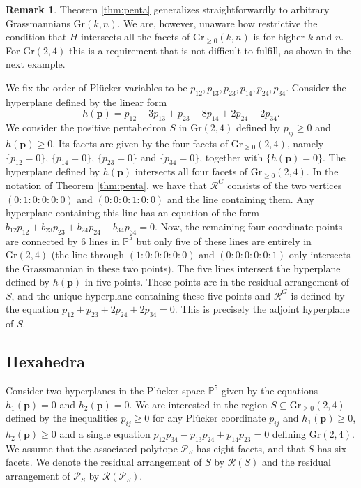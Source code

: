 \documentclass[12pt]{extarticle}
\theoremstyle{definition}
\newtheorem{remark}[theorem]{Remark}
\newenvironment{example}
{\pushQED{\qed}\renewcommand{\qedsymbol}{$\diamond$}\examplex}
{\popQED\endexamplex}
\begin{document}
\begin{remark}
    Theorem \ref{thm:penta} generalizes straightforwardly to arbitrary Grassmannians $\mathrm{Gr}(k,n)$. We are, however, unaware how restrictive the condition that $H$ intersects all the facets of $\mathrm{Gr}_{\geq 0}(k,n)$ is for higher $k$ and $n$. For $\mathrm{Gr}(2,4)$ this is a requirement that is not difficult to fulfill, as shown in the next example. 
\end{remark}

\begin{example}
    We fix the order of Pl\"ucker variables to be $p_{12},p_{13},p_{23},p_{14},p_{24},p_{34}$. Consider the hyperplane defined by the linear form
    $$h(\mathbf{p}) = p_{12} - 3p_{13} + p_{23} - 8p_{14} + 2p_{24} + 2p_{34}.$$
We consider the positive pentahedron $S$ in $\mathrm{Gr}(2,4)$ defined by $p_{ij}\geq 0$ and $h(\mathbf{p})\geq 0$. Its facets are given by the four facets of $\mathrm{Gr}_{\geq 0}(2,4)$, namely $\{p_{12} = 0\}$, $\{p_{14} = 0\}$, $\{p_{23} = 0\}$ and $\{p_{34} = 0\}$, together with $\{h(\mathbf{p}) = 0\}$. The hyperplane defined by $h(\mathbf{p})$ intersects all four facets of $\mathrm{Gr}_{\geq 0}(2,4)$. In the notation of Theorem \ref{thm:penta}, we have that $\mathcal{R}^G$ consists of the two vertices $(0:1:0:0:0:0)$ and $(0:0:0:1:0:0)$ and the line containing them. Any hyperplane containing this line has an equation of the form $b_{12}p_{12}+b_{23}p_{23}+b_{24}p_{24}+b_{34}p_{34}=0$. Now, the remaining four coordinate points are connected by $6$ lines in $\mathbb{P}^5$ but only five of these lines are entirely in $\mathrm{Gr}(2,4)$ (the line through $(1:0:0:0:0:0)$ and $(0:0:0:0:0:1)$ only intersects the Grassmannian in these two points). The five lines intersect the hyperplane defined by $h(\mathbf{p})$ in five points. These points are in the residual arrangement of $S$, and the unique hyperplane containing these five points and $\mathcal{R}^G$ is defined by the equation $p_{12} + p_{23} + 2p_{24} + 2p_{34} = 0$. This is precisely the adjoint hyperplane of $S$.  
\end{example}


\subsection{Hexahedra}
Consider two hyperplanes in the Pl\"ucker space $\mathbb{P}^5$ given by the equations $h_1(\mathbf{p}) = 0$ and $h_2(\mathbf{p}) = 0$. We are interested in the region $S \subseteq \mathrm{Gr}_{\geq 0}(2,4)$ defined by the inequalities $p_{ij} \geq 0$ for any Pl\"ucker coordinate $p_{ij}$ and $h_1(\mathbf{p})\geq 0$, $h_2(\mathbf{p})\geq 0$ and a single equation $p_{12}p_{34} - p_{13}p_{24}+p_{14}p_{23}=0$ defining $\mathrm{Gr}(2,4)$. We assume that the associated polytope $\mathcal{P}_S$ has eight facets, and that $S$ has six facets. We denote the residual arrangement of $S$ by $\mathcal{R}(S)$ and the residual arrangement of $\mathcal{P}_S$ by $\mathcal{R}(\mathcal{P}_S)$.
\end{document}

